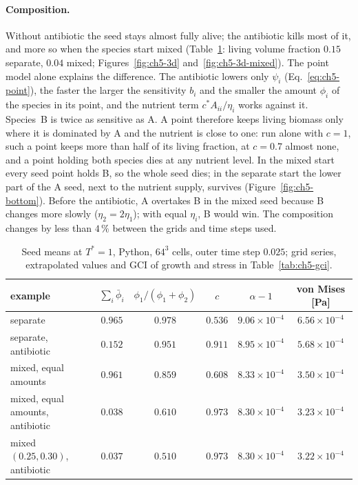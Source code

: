 \paragraph{Composition.} Without antibiotic the seed stays almost fully alive; the antibiotic kills most of it, and more so
when the species start mixed (Table~\ref{tab:ch5-two-species}: living volume fraction $0.15$ separate, $0.04$ mixed;
Figures~\ref{fig:ch5-3d} and~\ref{fig:ch5-3d-mixed}). The point model alone explains the difference. The antibiotic lowers
only $\psi_i$ (Eq.~\eqref{eq:ch5-point}), the faster the larger the sensitivity $b_i$ and the smaller the amount $\phi_i$
of the species in its point, and the nutrient term $c^*A_{ii}/\eta_i$ works against it. Species~B is twice as sensitive
as A. A point therefore keeps living biomass only where it is dominated by A and the nutrient is close to one: run alone
with $c=1$, such a point keeps more than half of its living fraction, at $c=0.7$ almost none, and a point holding both
species dies at any nutrient level. In the mixed start every seed point holds B, so the whole seed dies; in the separate
start the lower part of the A seed, next to the nutrient supply, survives (Figure~\ref{fig:ch5-bottom}). Before the antibiotic, A overtakes B in the
mixed seed because B changes more slowly ($\eta_2=2\eta_1$); with equal $\eta_i$, B would win. The composition changes
by less than $4\,\%$ between the grids and time steps used.

\begin{table}[htbp]
  \centering
  \caption[Two species with nutrient and antibiotic]{Seed means at $T^*=1$, Python, $64^3$ cells,
    outer time step $0.025$; grid series, extrapolated values and GCI of growth and stress in Table~\ref{tab:ch5-gci}.}
  \label{tab:ch5-two-species}
  \small
  \setlength{\tabcolsep}{4pt}
  \begin{tabular}{lccccc}
    \toprule
    example & $\sum_i\bar\phi_i$ & $\phi_1/(\phi_1+\phi_2)$ & $c$ & $\alpha-1$ & von Mises [Pa] \\
    \midrule
    separate & $0.965$ & $0.978$ & $0.536$ & $9.06\times10^{-4}$ & $6.56\times10^{-4}$ \\
    separate, antibiotic & $0.152$ & $0.951$ & $0.911$ & $8.95\times10^{-4}$ & $5.68\times10^{-4}$ \\
    mixed, equal amounts & $0.961$ & $0.859$ & $0.608$ & $8.33\times10^{-4}$ & $3.50\times10^{-4}$ \\
    mixed, equal amounts, antibiotic & $0.038$ & $0.610$ & $0.973$ & $8.30\times10^{-4}$ & $3.23\times10^{-4}$ \\
    mixed $(0.25, 0.30)$, antibiotic & $0.037$ & $0.510$ & $0.973$ & $8.30\times10^{-4}$ & $3.22\times10^{-4}$ \\
    \bottomrule
  \end{tabular}
\end{table}

